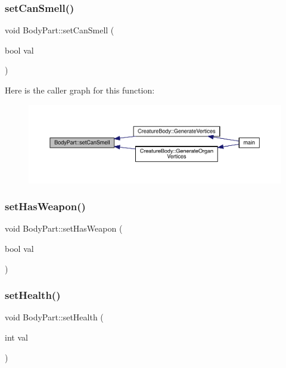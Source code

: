 \subsubsection{\texorpdfstring{set\+Can\+Smell()}{setCanSmell()}}
{\footnotesize\ttfamily void Body\+Part\+::set\+Can\+Smell (\begin{DoxyParamCaption}\item[{bool}]{val }\end{DoxyParamCaption})}

Here is the caller graph for this function\+:
\nopagebreak
\begin{figure}[H]
\begin{center}
\leavevmode
\includegraphics[width=350pt]{class_body_part_acc147f8434d4bf881ee4b54e1b79c439_icgraph}
\end{center}
\end{figure}
\mbox{\label{class_body_part_a15d3ae087969dc50e7db331c73bd346b}} 
\subsubsection{\texorpdfstring{set\+Has\+Weapon()}{setHasWeapon()}}
{\footnotesize\ttfamily void Body\+Part\+::set\+Has\+Weapon (\begin{DoxyParamCaption}\item[{bool}]{val }\end{DoxyParamCaption})}

\mbox{\label{class_body_part_aca91d2ed2644a952b437a3e1f5155318}} 
\subsubsection{\texorpdfstring{set\+Health()}{setHealth()}}
{\footnotesize\ttfamily void Body\+Part\+::set\+Health (\begin{DoxyParamCaption}\item[{int}]{val }\end{DoxyParamCaption})}

